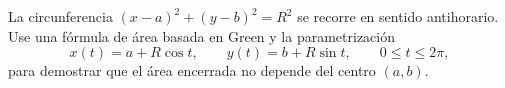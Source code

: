 La circunferencia $(x-a)^2+(y-b)^2=R^2$ se recorre en sentido antihorario. Use una fórmula de área basada en Green y la parametrización
\[
x(t)=a+R\cos t,\qquad y(t)=b+R\sin t,\qquad0\leq t\leq2\pi,
\]
para demostrar que el área encerrada no depende del centro $(a,b)$.
